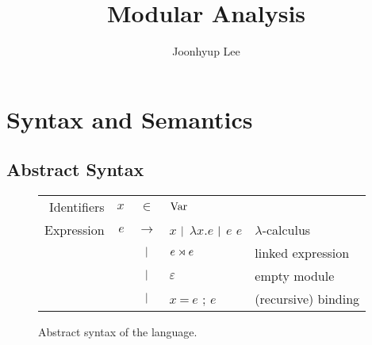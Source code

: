 \documentclass{article}
\title{Modular Analysis}
\author{Joonhyup Lee}
\begin{document}
\maketitle
\section{Syntax and Semantics}
\subsection{Abstract Syntax}
\begin{figure}[htb]
	\centering
	\small
	\begin{tabular}{rrcll}
		Identifiers & $x$ & $\in$         & $\text{Var}$                                                      \\
		Expression  & $e$ & $\rightarrow$ & $x$ $|$ $\lambda x.e$ $|$ $e$ $e$ & $\lambda$-calculus  \\
		            &     & $|$       & $e\rtimes e$                             & linked expression   \\
		            &     & $|$       & $\varepsilon$                             & empty module        \\
		            &     & $|$       & $x\:\texttt{=}\:e$ ; $e$                  & (recursive) binding
	\end{tabular}
	\caption{Abstract syntax of the language.}
	\label{fig:syntax}
\end{figure}
\end{document}
